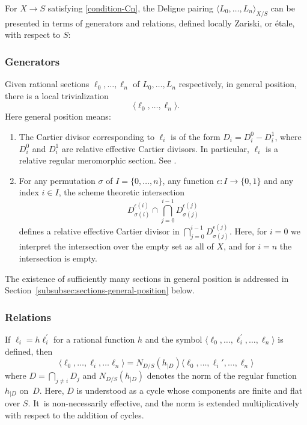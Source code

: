 \begin{construction} For $X\to S$ satisfying \eqref{condition-Cn}, the Deligne pairing $\langle L_{0},\ldots,L_{n}\rangle_{X/S}$ can be presented in terms of generators and relations, defined locally Zariski, or étale, with respect to $S$:
\subsubsection*{Generators}
Given rational sections $\ell_{0}, \ldots, \ell_n$ of $L_{0},\ldots,L_{n}$ respectively, in general position, there is a local trivialization\vspace*{-3pt}\enlargethispage{.5\baselineskip}
\begin{equation}\label{def:symbol}
\langle \ell_{0}, \ldots, \ell_n \rangle.
\end{equation} Here general position means:
\begin{enumerate}
\item\label{item:generators-1} The Cartier divisor corresponding to $\ell_i$ is of the form $D_{i}=D_i^0 - D_i^1$, where $D_i^0 $ and $D_i^1$ are relative effective Cartier divisors. In particular, $\ell_{i}$ is a relative regular meromorphic section. See \cite[]{EGAIV4}.
\item\label{item:generators-2} For any permutation $\sigma$ of $I=\lbrace 0,\ldots,n\rbrace$, any function $\epsilon: I \to \{0,1 \}$ and any index $i\in I$, the scheme theoretic intersection\vspace*{-3pt}
\begin{displaymath}
D_{\sigma(i)}^{\epsilon(i)} \cap \bigcap_{j=0}^{i-1} D_{\sigma(j)}^{\epsilon(j)}
\end{displaymath}
defines a relative effective Cartier divisor in $\bigcap_{j=0}^{i-1} D_{\sigma(j)}^{\epsilon(j)}$. Here, for $i=0$ we interpret the intersection over the empty set as all of $X$, and for $i=n$ the intersection is empty.
\end{enumerate}
The existence of sufficiently many sections in general position is addressed in Section~\ref{subsubsec:sections-general-position} below.

\subsubsection*{Relations}
If $\ell_i = h \ell_i^{\prime}$ for a rational function $h$ and the symbol $\langle\ell_{0},\ldots,\ell_{i}^{\prime},\ldots,\ell_{n}\rangle$ is defined, then\vspace*{-3pt}
\begin{equation}\label{eq:relationElkikDucrot}
\langle \ell_{0}, \ldots, \ell_i,\ldots \ell_n \rangle = N_{D/S}(h_{\mid D}) \langle \ell_{0}, \ldots, \ell_i', \ldots, \ell_n \rangle
\end{equation}
where $D = \bigcap_{j \neq i} D_j $ and $N_{D/S}(h_{\mid D})$ denotes the norm of the regular function $h_{\mid D}$ on~$D$. Here, $D$ is understood as a cycle whose components are finite and flat over $S$. It~is non-necessarily effective, and the norm is extended multiplicatively with respect to the addition of cycles.
\end{construction}


